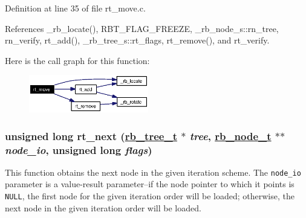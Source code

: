 Definition at line 35 of file rt\_\-move.c.

References \_\-rb\_\-locate(), RBT\_\-FLAG\_\-FREEZE, \_\-rb\_\-node\_\-s::rn\_\-tree, rn\_\-verify, rt\_\-add(), \_\-rb\_\-tree\_\-s::rt\_\-flags, rt\_\-remove(), and rt\_\-verify.

Here is the call graph for this function:\begin{figure}[H]
\begin{center}
\leavevmode
\includegraphics[width=148pt]{group__dbprim__rbtree_ga7_cgraph}
\end{center}
\end{figure}
\hypertarget{group__dbprim__rbtree_ga10}{
\subsubsection[rt\_\-next]{\setlength{\rightskip}{0pt plus 5cm}unsigned long rt\_\-next (\hyperlink{struct__rb__tree__s}{rb\_\-tree\_\-t} $\ast$ {\em tree}, \hyperlink{struct__rb__node__s}{rb\_\-node\_\-t} $\ast$$\ast$ {\em node\_\-io}, unsigned long {\em flags})}}
\label{group__dbprim__rbtree_ga10}


This function obtains the next node in the given iteration scheme. The {\tt node\_\-io} parameter is a value-result parameter--if the node pointer to which it points is {\tt NULL}, the first node for the given iteration order will be loaded; otherwise, the next node in the given iteration order will be loaded.

